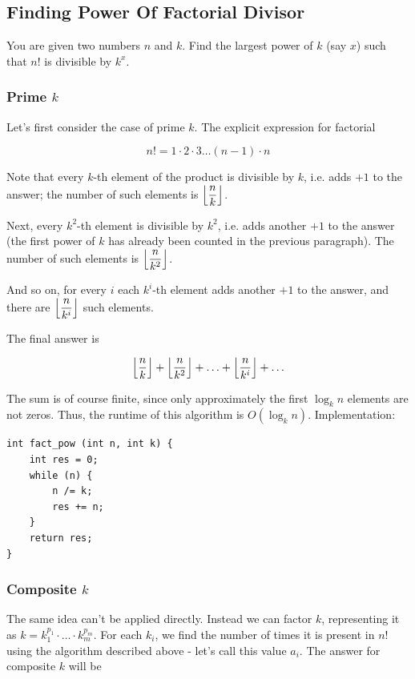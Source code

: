 \documentclass[8pt, a4paper, oneside, twocolumn]{extarticle}
\begin{document}
\subsection{Finding Power Of Factorial Divisor}
You are given two numbers $n$ and $k$. Find the largest power of $k$ (say $x$) such that $n!$ is divisible by $k^x$.
\subsubsection{Prime $k$}

Let's first consider the case of prime $k$. The explicit expression for factorial

$$n! = 1 \cdot 2 \cdot 3 \ldots (n-1) \cdot n$$

Note that every $k$-th element of the product is divisible by $k$, i.e. adds $+1$ to the answer; the number of such elements is $\Bigl\lfloor\dfrac{n}{k}\Bigr\rfloor$.

Next, every $k^2$-th element is divisible by $k^2$, i.e. adds another $+1$ to the answer (the first power of $k$ has already been counted in the previous paragraph). The number of such elements is $\Bigl\lfloor\dfrac{n}{k^2}\Bigr\rfloor$.

And so on, for every $i$ each $k^i$-th element adds another $+1$ to the answer, and there are $\Bigl\lfloor\dfrac{n}{k^i}\Bigr\rfloor$ such elements.

The final answer is

$$\Bigl\lfloor\dfrac{n}{k}\Bigr\rfloor + \Bigl\lfloor\dfrac{n}{k^2}\Bigr\rfloor + \ldots + \Bigl\lfloor\dfrac{n}{k^i}\Bigr\rfloor + \ldots$$

The sum is of course finite, since only approximately the first $\log_k n$ elements are not zeros. Thus, the runtime of this algorithm is $O(\log_k n)$.
Implementation:
\begin{verbatim}
int fact_pow (int n, int k) {
	int res = 0;
	while (n) {
		n /= k;
		res += n;
	}
	return res;
}
\end{verbatim}
\subsubsection{Composite $k$}

The same idea can't be applied directly. Instead we can factor $k$, representing it as $k = k_1^{p_1} \cdot \ldots \cdot k_m^{p_m}$. For each $k_i$, we find the number of times it is present in $n!$ using the algorithm described above - let's call this value $a_i$. The answer for composite $k$ will be
\end{document}
